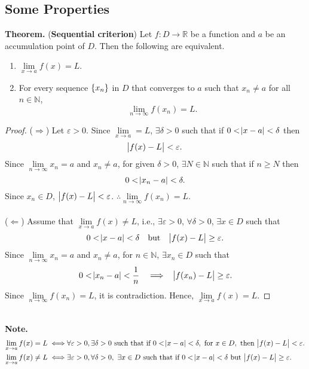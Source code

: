 \documentclass[12pt,a4paper]{article}
\begin{document}
\subsection{Some Properties}
\begin{tcolorbox}[colback=white]
	\textbf{Theorem.} (\textbf{Sequential criterion}) Let $f:D\to\mathbb{R}$ be a function and $a$ be an accumulation point of $D$. Then the following are equivalent.\begin{enumerate}
		\item \(\lim\limits_{x\to a}f(x)=L\).
		\item For every sequence $\set{x_n}$ in $D$ that converges to $a$ such that $x_n\neq a$ for all $n\in\mathbb{N}$, \[
		\lim\limits_{n\to\infty}f(x_n)=L.
		\]
	\end{enumerate}\tcblower\begin{proof}
	($\Rightarrow$) Let $\varepsilon>0$. Since $\lim\limits_{x\to a}=L$, $\exists\delta>0$ such that if $0<\abs{x-a}<\delta$ then \[
	\abs{f(x)-L}<\varepsilon.
	\] Since $\lim\limits_{n\to\infty}x_n=a$ and $x_n\neq a$, for given $\delta>0$, $\exists N\in\mathbb{N}$ such that if $n\geq N$ then \[
	0<\abs{x_n-a}<\delta.
	\] Since $x_n\in D$,\ $\abs{f(x)-L}<\varepsilon$. $\therefore\lim\limits_{n\to\infty}f(x_n)=L$.\\
	\\
	($\Leftarrow$) Assume that $\lim\limits_{x\to a}f(x)\neq L$, i.e., $\exists\varepsilon>0$, $\forall\delta>0$, $\exists x\in D$ such that \[
	0<\abs{x-a}<\delta\quad \text{but}\quad \abs{f(x)-L}\geq\varepsilon.
	\] Since $\lim\limits_{n\to\infty}x_n=a$ and $x_n\neq a$, for $n\in\mathbb{N}$, $\exists x_n\in D$ such that \[
	0<\abs{x_n-a}<\frac{1}{n}\quad\Longrightarrow\quad\abs{f(x_n)-L}\geq\varepsilon.
	\] Since $\lim\limits_{n\to\infty}f(x_n)=L$, it is contradiction. Hence, $\lim\limits_{x\to a}f(x)=L$.
\end{proof}
\end{tcolorbox}\
\\
\textbf{Note.} \begin{align*}
\lim\limits_{x\to a}f(x)=L \iff &\forall\varepsilon>0, \exists\delta>0\ \text{such that if}\ 0<\abs{x-a}<\delta,\ \text{for}\ x\in D,\ \text{then}\ \abs{f(x)-L}<\varepsilon. \\
\lim\limits_{x\to a}f(x)\neq L \iff &\exists\varepsilon>0, \forall\delta>0,\ \exists x\in D\ \text{such that if}\ 0<\abs{x-a}<\delta\ \text{but}\ \abs{f(x)-L}\geq\varepsilon. \\
\end{align*}
\end{document}
